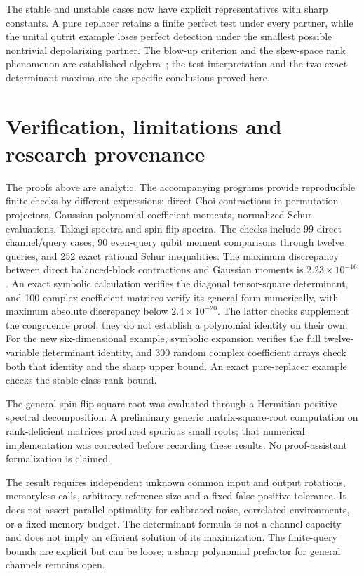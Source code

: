 \documentclass[11pt,a4paper]{article}
\theoremstyle{remark}\newtheorem{remark}[theorem]{Remark}
\begin{document}
The stable and unstable cases now have explicit representatives with sharp constants. A pure replacer retains a finite perfect test under every partner, while the unital qutrit example loses perfect detection under the smallest possible nontrivial depolarizing partner. The blow-up criterion and the skew-space rank phenomenon are established algebra~\cite{li,degree}; the test interpretation and the two exact determinant maxima are the specific conclusions proved here.

\section{Verification, limitations and research provenance}
The proofs above are analytic. The accompanying programs provide reproducible finite checks by different expressions: direct Choi contractions in permutation projectors, Gaussian polynomial coefficient moments, normalized Schur evaluations, Takagi spectra and spin-flip spectra. The checks include 99 direct channel/query cases, 90 even-query qubit moment comparisons through twelve queries, and 252 exact rational Schur inequalities. The maximum discrepancy between direct balanced-block contractions and Gaussian moments is $2.23\times10^{-16}$. An exact symbolic calculation verifies the diagonal tensor-square determinant, and 100 complex coefficient matrices verify its general form numerically, with maximum absolute discrepancy below $2.4\times10^{-20}$. The latter checks supplement the congruence proof; they do not establish a polynomial identity on their own. For the new six-dimensional example, symbolic expansion verifies the full twelve-variable determinant identity, and 300 random complex coefficient arrays check both that identity and the sharp upper bound. An exact pure-replacer example checks the stable-class rank bound.

The general spin-flip square root was evaluated through a Hermitian positive spectral decomposition. A preliminary generic matrix-square-root computation on rank-deficient matrices produced spurious small roots; that numerical implementation was corrected before recording these results. No proof-assistant formalization is claimed.

The result requires independent unknown common input and output rotations, memoryless calls, arbitrary reference size and a fixed false-positive tolerance. It does not assert parallel optimality for calibrated noise, correlated environments, or a fixed memory budget. The determinant formula is not a channel capacity and does not imply an efficient solution of its maximization. The finite-query bounds are explicit but can be loose; a sharp polynomial prefactor for general channels remains open.
\end{document}
